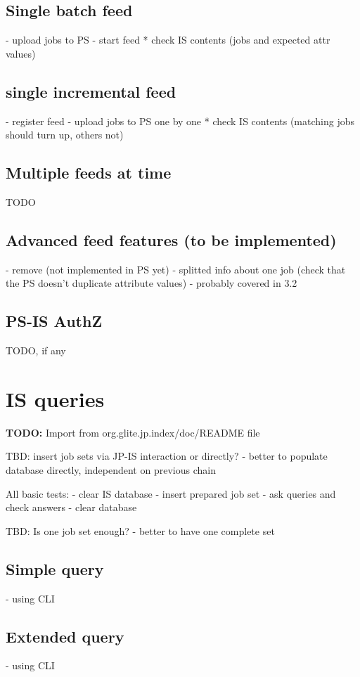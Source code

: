 \documentclass{egee}
\def\todo#1{\textbf{TODO:} #1}
\begin{document}
\subsection{Single batch feed}
- upload jobs to PS
- start feed
* check IS contents (jobs and expected attr values)

\subsection{single incremental feed}
- register feed
- upload jobs to PS one by one
* check IS contents (matching jobs should turn up, others not)

\subsection{Multiple feeds at time}
TODO

\subsection{Advanced feed features (to be implemented)}
- remove (not implemented in PS yet)
- splitted info about one job (check that the PS doesn't duplicate
  attribute values) - probably covered in 3.2


\subsection{PS-IS AuthZ}
TODO, if any

\section{IS queries}
\todo{Import from org.glite.jp.index/doc/README file}


TBD: insert job sets via JP-IS interaction or directly?
        - better to populate database directly, independent on previous chain

All basic tests:
- clear IS database
- insert prepared job set
- ask queries and check answers
- clear database

TBD: Is one job set enough?
        - better to have one complete set

\subsection{Simple query}
- using CLI

\subsection{Extended query}
- using CLI
\end{document}

